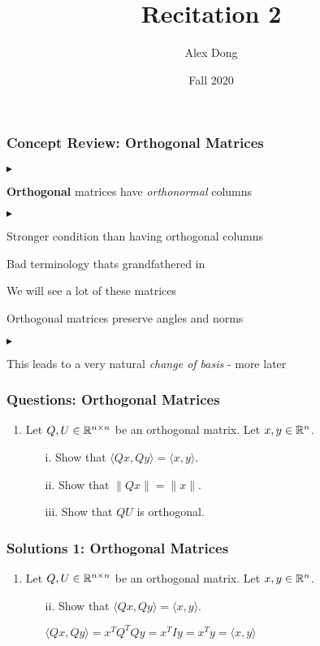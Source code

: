 \documentclass[table]{beamer}
\title{Recitation 2}
\author{Alex Dong}
\institute{CDS, NYU}
\date{Fall 2020}
\renewenvironment{itemize}
\renewenvironment{enumerate}%
{\begin{list}{\arabic{enumi}.}%
      {\setlength{\leftmargin}{2.5em}%
       \setlength{\itemsep}{-\parsep}%
       \setlength{\topsep}{-\parskip}%
       \usecounter{enumi}}%
 }{\end{list}}
\renewenvironment{itemize}%
{\begin{list}{$\blacktriangleright$}%
      {\setlength{\leftmargin}{2.5em}%
       \setlength{\itemsep}{-\parsep}%
       \setlength{\topsep}{-\parskip}%
       \usecounter{enumi}}%
 }{\end{list}}
\begin{document}
\frame{\titlepage} 

\begin{frame}
\frametitle{Concept Review: Orthogonal Matrices}
\begin{itemize}
\item \textbf{Orthogonal} matrices have \textit{orthonormal} columns
\begin{itemize}
\item Stronger condition than having orthogonal columns
\item Bad terminology thats grandfathered in
\end{itemize}
\item We will see a lot of these matrices
\item Orthogonal matrices preserve angles and norms
\begin{itemize}
\item This leads to a very natural \textit{change of basis} - more later
\end{itemize}
\end{itemize}
\end{frame}

\begin{frame}
\frametitle{Questions: Orthogonal Matrices}
\begin{enumerate}
\item Let $Q,U \in \mathbb{R}^{n \times n}$ be an orthogonal matrix. Let $x,y \in \mathbb{R}^n$.
\begin{enumerate}
\item[i.] Show that $\langle Qx, Qy \rangle = \langle x, y \rangle.$ 
\item[ii.] Show that $\|Qx\| = \|x\|.$
\item[iii.] Show that $QU$ is orthogonal.
\end{enumerate}
\end{enumerate}
\end{frame}


\begin{frame}
\frametitle{Solutions 1: Orthogonal Matrices}
\begin{enumerate}
\item Let $Q,U \in \mathbb{R}^{n \times n}$ be an orthogonal matrix. Let $x,y \in \mathbb{R}^n$.
\begin{enumerate}
\item[ii.]  Show that $\langle Qx, Qy \rangle = \langle x, y \rangle.$
\begin{solution}
$\langle Qx, Qy \rangle = x^TQ^TQy = x^T I y = x^Ty = \langle x, y \rangle$

\end{solution}
\end{enumerate}
\end{enumerate}
\end{frame}
\end{document}
